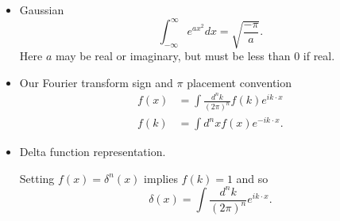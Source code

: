 %
%

\begin{itemize}
\item Gaussian
\begin{dmath}\label{eqn:usefulFormulas:20}
\int_{-\infty}^\infty e^{a x^2} dx = \sqrt{\frac{-\pi}{a}}.
\end{dmath}
Here \( a \) may be real or imaginary, but must be less than 0 if real.
\item Our Fourier transform sign and \( \pi \) placement convention
\begin{dmath}\label{eqn:usefulFormulas:40}
\begin{aligned}
f(x) &= \int \frac{d^n k}{(2 \pi)^n} f(k) e^{i k \cdot x} \\
f(k) &= \int d^n x f(x) e^{-i k \cdot x}.
\end{aligned}
\end{dmath}
\item Delta function representation.

Setting \( f(x) = \delta^n(x) \) implies \( f(k) = 1 \) and so
\begin{dmath}\label{eqn:usefulFormulas:60}
\delta(x) = \int \frac{d^n k}{(2 \pi)^n} e^{i k \cdot x}.
\end{dmath}


\end{itemize}
